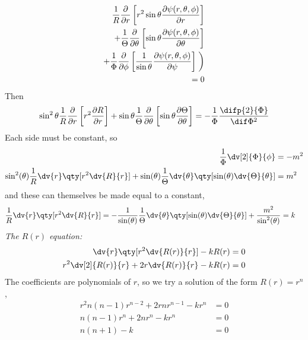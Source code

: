     \begin{equation*}
      \begin{split}
        \frac{1}{R} \frac{\partial}{\partial r} \left[r^2 \sin \theta
          \frac{\partial \psi(r, \theta, \phi)}{\partial r} \right] \\
        + \frac{1}{\Theta} \frac{\partial}{\partial \theta} \left[
          \sin \theta \frac{\partial \psi(r, \theta, \phi)}{\partial
            \theta}\right] \\ + \frac{1}{\Phi}
        \frac{\partial}{\partial \phi} \left[ \frac{1}{\sin \theta}
          \frac{\partial \psi(r, \theta, \phi)}{\partial \psi }\right]
        \left.\vphantom{\frac{1}{2}}\right) \\=0
      \end{split}
    \end{equation*}
    Then
    \begin{equation*}
      \sin^2\theta \frac{1}{R} \frac{\partial}{\partial r} \left[ r^2 \frac{\partial R}{\partial r} \right]
      +\sin \theta \frac{1}{\Theta} \frac{\partial}{\partial \theta} \left[ \sin \theta \frac{\partial \Theta}{\partial \theta}\right] 
      = - \frac{1}{\Phi} \frac{\difp{2}{\Phi}}{\dif \Phi^2}
    \end{equation*}
    Each side must be constant, so
    \begin{align*}
      \frac{1}{\Phi} \dv[2]{\Phi}{\phi} &= -m^2 \\
      \sin^2(\theta) \frac{1}{R} \dv{r} \qty[r^2 \dv{R}{r}] +
      \sin(\theta) \frac{1}{\Theta} \dv{\theta} \qty[\sin(\theta)
      \dv{\Theta}{\theta}] &= m^2
    \end{align*}
    and these can themselves be made equal to a constant,
    \begin{align*}
      \frac{1}{R} \dv{r} \qty[r^2 \dv{R}{r}] &= -
      \frac{1}{\sin(\theta)} \frac{1}{\Theta} \dv{\theta}
      \qty[\sin(\theta) \dv{\Theta}{\theta}] +
      \frac{m^2}{\sin^2(\theta)} = k
    \end{align*}
    {\em The $R(r)$ equation:}\\
    \begin{align*}
      \dv{r} \qty[r^2 \dv{R(r)}{r}] - kR(r) &= 0 \\
      r^2 \dv[2]{R(r)}{r} + 2r \dv{R(r)}{r} - kR(r) &=0
    \end{align*}
    The coefficients are polynomials of $r$, so we try a solution of
    the form $R(r) = r^n$,
    \begin{align*}
      r^2n(n-1) r^{n-2} + 2r nr^{n-1} - kr^n &= 0 \\
      n(n-1)r^n + 2nr^n - kr^n &= 0 \\
      n(n+1) - k &= 0
    \end{align*}
